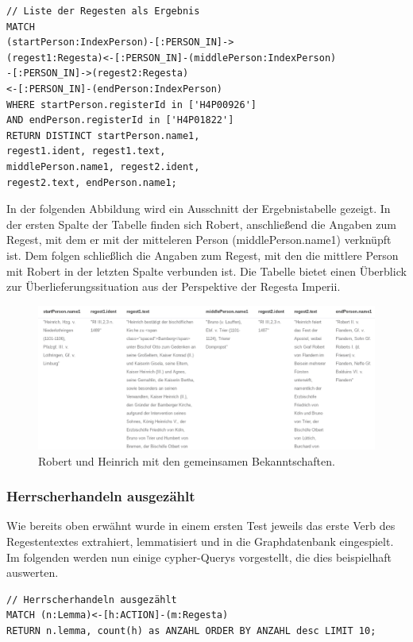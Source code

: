 \begin{verbatim}
// Liste der Regesten als Ergebnis
MATCH
(startPerson:IndexPerson)-[:PERSON_IN]->
(regest1:Regesta)<-[:PERSON_IN]-(middlePerson:IndexPerson)
-[:PERSON_IN]->(regest2:Regesta)
<-[:PERSON_IN]-(endPerson:IndexPerson)
WHERE startPerson.registerId in ['H4P00926']
AND endPerson.registerId in ['H4P01822']
RETURN DISTINCT startPerson.name1,
regest1.ident, regest1.text,
middlePerson.name1, regest2.ident,
regest2.text, endPerson.name1;
\end{verbatim}

In der folgenden Abbildung wird ein Ausschnitt der Ergebnistabelle
gezeigt. In der ersten Spalte der Tabelle finden sich Robert,
anschließend die Angaben zum Regest, mit dem er mit der mitteleren
Person (middlePerson.name1) verknüpft ist. Dem folgen schließlich die
Angaben zum Regest, mit den die mittlere Person mit Robert in der
letzten Spalte verbunden ist. Die Tabelle bietet einen Überblick zur
Überlieferungssituation aus der Perspektive der Regesta Imperii.

\begin{figure}
\centering
\includegraphics{Bilder/RI2Graph/RobertHeinrichApocTabelle.png}
\caption{Robert und Heinrich mit den gemeinsamen Bekanntschaften.}
\end{figure}

\hypertarget{herrscherhandeln-ausgezuxe4hlt}{%
\subsubsection{Herrscherhandeln
ausgezählt}\label{herrscherhandeln-ausgezuxe4hlt}}

Wie bereits oben erwähnt wurde in einem ersten Test jeweils das erste
Verb des Regestentextes extrahiert, lemmatisiert und in die
Graphdatenbank eingespielt. Im folgenden werden nun einige cypher-Querys
vorgestellt, die dies beispielhaft auswerten.

\begin{verbatim}
// Herrscherhandeln ausgezählt
MATCH (n:Lemma)<-[h:ACTION]-(m:Regesta)
RETURN n.lemma, count(h) as ANZAHL ORDER BY ANZAHL desc LIMIT 10;
\end{verbatim}

